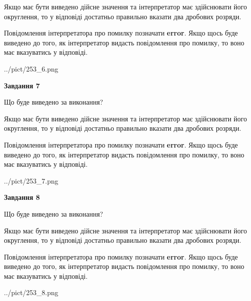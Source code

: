 \documentclass[12pt, ukrainian]{article}
\begin{document}
{\begin {Large}
Якщо має бути виведено дійсне значення та інтерпретатор має здійснювати його округлення, 
то у відповіді достатньо правильно вказати два дробових розряди.

Повідомлення інтерпретатора про помилку позначати \textbf{error}.
Якщо щось буде виведено до того, як інтерпретатор видасть повідомлення про помилку, 
то воно має вказуватись у відповіді. \par

\begin{center}
	{../pict/253_6.png}
\end{center}
\newpage

{\begin {center}\textbf{Завдання 7}\end {center}}\par
Що буде виведено за виконання? \par

Якщо має бути виведено дійсне значення та інтерпретатор має здійснювати його округлення, 
то у відповіді достатньо правильно вказати два дробових розряди.

Повідомлення інтерпретатора про помилку позначати \textbf{error}.
Якщо щось буде виведено до того, як інтерпретатор видасть повідомлення про помилку, 
то воно має вказуватись у відповіді. \par

\begin{center}
	{../pict/253_7.png}
\end{center}
\newpage

{\begin {center}\textbf{Завдання 8}\end {center}}\par
Що буде виведено за виконання? \par

Якщо має бути виведено дійсне значення та інтерпретатор має здійснювати його округлення, 
то у відповіді достатньо правильно вказати два дробових розряди.

Повідомлення інтерпретатора про помилку позначати \textbf{error}.
Якщо щось буде виведено до того, як інтерпретатор видасть повідомлення про помилку, 
то воно має вказуватись у відповіді. \par

\begin{center}
	{../pict/253_8.png}
\end{center}
\newpage


\end{Large}}
\end{document}
